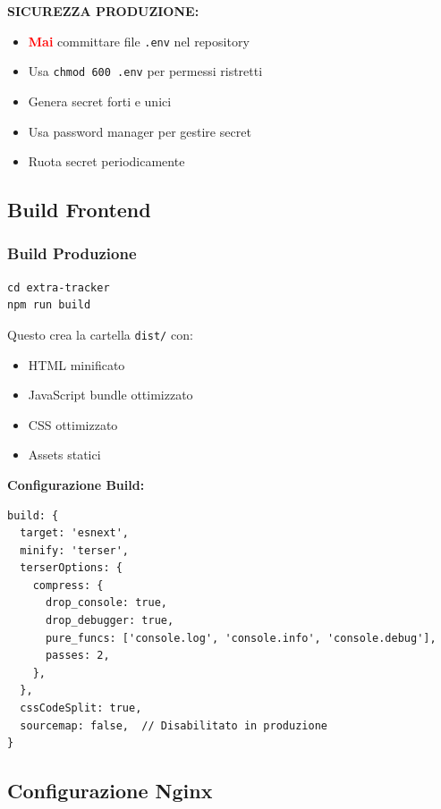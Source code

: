 \documentclass[11pt,a4paper]{article}
\newcommand{\code}[1]{\texttt{#1}}
\newcommand{\important}[1]{\textcolor{red}{\textbf{#1}}}
\begin{document}
\begin{importantbox}
\textbf{SICUREZZA PRODUZIONE:}
\begin{itemize}
    \item \important{Mai} committare file \code{.env} nel repository
    \item Usa \code{chmod 600 .env} per permessi ristretti
    \item Genera secret forti e unici
    \item Usa password manager per gestire secret
    \item Ruota secret periodicamente
\end{itemize}
\end{importantbox}

\subsection{Build Frontend}

\subsubsection{Build Produzione}

\begin{lstlisting}[caption=Build Frontend]
cd extra-tracker
npm run build
\end{lstlisting}

Questo crea la cartella \code{dist/} con:
\begin{itemize}
    \item HTML minificato
    \item JavaScript bundle ottimizzato
    \item CSS ottimizzato
    \item Assets statici
\end{itemize}

\textbf{Configurazione Build:}
\begin{lstlisting}[caption=vite.config.ts - Build]
build: {
  target: 'esnext',
  minify: 'terser',
  terserOptions: {
    compress: {
      drop_console: true,
      drop_debugger: true,
      pure_funcs: ['console.log', 'console.info', 'console.debug'],
      passes: 2,
    },
  },
  cssCodeSplit: true,
  sourcemap: false,  // Disabilitato in produzione
}
\end{lstlisting}

\subsection{Configurazione Nginx}
\end{document}
